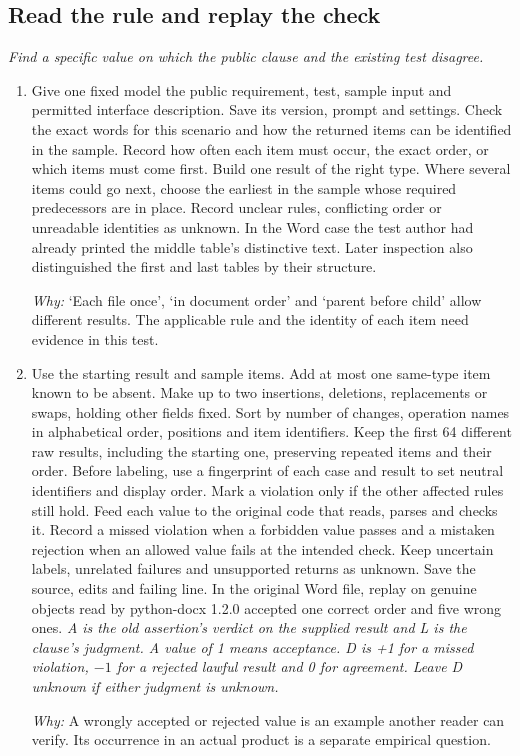 \documentclass[10pt,a4paper]{article}
\begin{document}
\subsection*{Read the rule and replay the check}
\emph{Find a specific value on which the public clause and the existing test disagree.}
\begin{enumerate}[leftmargin=*,start=2]
  \item Give one fixed model the public requirement, test, sample input and permitted interface description. Save its version, prompt and settings. Check the exact words for this scenario and how the returned items can be identified in the sample. Record how often each item must occur, the exact order, or which items must come first. Build one result of the right type. Where several items could go next, choose the earliest in the sample whose required predecessors are in place. Record unclear rules, conflicting order or unreadable identities as unknown. In the Word case the test author had already printed the middle table’s distinctive text. Later inspection also distinguished the first and last tables by their structure.
\par\emph{Why:} ‘Each file once’, ‘in document order’ and ‘parent before child’ allow different results. The applicable rule and the identity of each item need evidence in this test.
  \item Use the starting result and sample items. Add at most one same-type item known to be absent. Make up to two insertions, deletions, replacements or swaps, holding other fields fixed. Sort by number of changes, operation names in alphabetical order, positions and item identifiers. Keep the first 64 different raw results, including the starting one, preserving repeated items and their order. Before labeling, use a fingerprint of each case and result to set neutral identifiers and display order. Mark a violation only if the other affected rules still hold. Feed each value to the original code that reads, parses and checks it. Record a missed violation when a forbidden value passes and a mistaken rejection when an allowed value fails at the intended check. Keep uncertain labels, unrelated failures and unsupported returns as unknown. Save the source, edits and failing line. In the original Word file, replay on genuine objects read by python-docx 1.2.0 accepted one correct order and five wrong ones.
\noindent\emph{A is the old assertion’s verdict on the supplied result and L is the clause’s judgment. A value of 1 means acceptance. D is +1 for a missed violation, \(- 1\) for a rejected lawful result and 0 for agreement. Leave D unknown if either judgment is unknown.}
\par{}
\par\emph{Why:} A wrongly accepted or rejected value is an example another reader can verify. Its occurrence in an actual product is a separate empirical question.
\end{enumerate}
\end{document}
